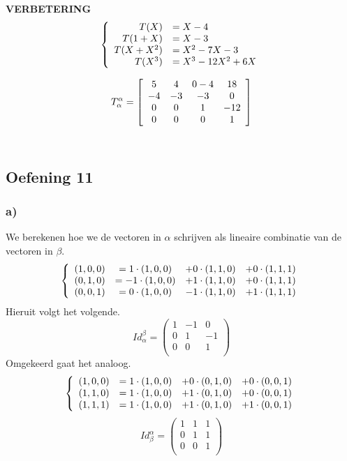 \documentclass[lineaire_algebra_oplossingen.tex]{subfiles}
\begin{document}
\textbf{VERBETERING}
\[
\left\lbrace
\begin{array}{r l}
T(X) &= X-4\\
T(1+X) &= X-3\\
T(X+X^2) &= X^2-7X-3\\
T(X^3) &= X^3-12X^2+6X\\
\end{array}
\right.
\]

\[
T^{\alpha}_{\alpha} =
\left[
\begin{array}{c c c c}
5 & 4 & 0-4 & 18\\
-4 & -3 & -3 & 0\\
0 & 0 & 1 & -12\\
0 & 0 & 0 & 1
\end{array}
\right]
\]\\

\subsection{Oefening 11}
\subsubsection*{a)}
We berekenen hoe we de vectoren in $\alpha$ schrijven als lineaire combinatie van de vectoren in $\beta$.
\[
\left\lbrace
\begin{array}{c c c c}
(1,0,0) &= 1\cdot (1,0,0) &+ 0\cdot (1,1,0) &+ 0\cdot (1,1,1)\\
(0,1,0) &= -1\cdot(1,0,0) &+ 1\cdot (1,1,0) &+ 0\cdot (1,1,1)\\
(0,0,1) &= 0\cdot(1,0,0) &-1\cdot (1,1,0) &+ 1\cdot (1,1,1)
\end{array}
\right.
\]
Hieruit volgt het volgende.
\[
Id_\alpha^\beta = 
\begin{pmatrix}
1 & -1 & 0\\
0 & 1 & -1\\
0 & 0 & 1\\
\end{pmatrix}
\]
Omgekeerd gaat het analoog.
\[
\left\lbrace
\begin{array}{c c c c}
(1,0,0) &= 1\cdot (1,0,0) &+ 0\cdot (0,1,0) &+ 0\cdot (0,0,1)\\
(1,1,0) &= 1\cdot (1,0,0) &+ 1\cdot (0,1,0) &+ 0\cdot (0,0,1)\\
(1,1,1) &= 1\cdot (1,0,0) &+ 1\cdot (0,1,0) &+ 1\cdot (0,0,1)
\end{array}
\right.
\]
\[
Id_\beta^\alpha = 
\begin{pmatrix}
1 & 1 & 1\\
0 & 1 & 1\\
0 & 0 & 1\\
\end{pmatrix}
\]
\end{document}
